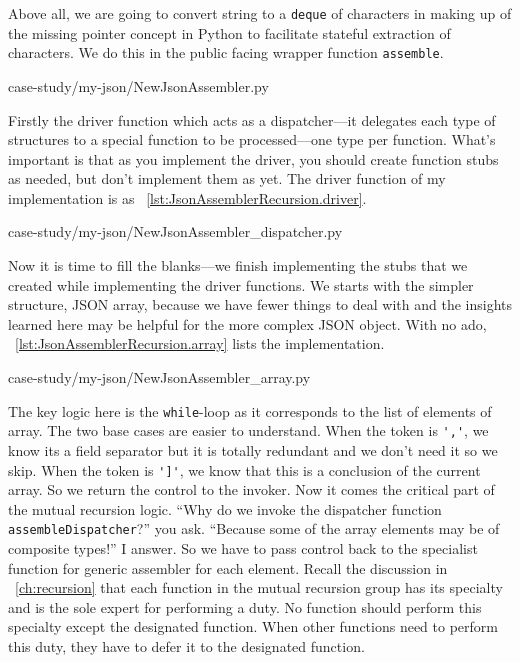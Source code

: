 \documentclass[oneside,11pt]{book}
\theoremstyle{definition}
\theoremstyle{remark}
\newcommand{\code}[1]{\mbox{\lstinline{#1}}}
\newcommand{\python}{Python }
\begin{document}
Above all, we are going to convert string to a \code{deque} of characters in making up of the
missing pointer concept in \python to facilitate stateful extraction of characters.
We do this in the public facing wrapper function \code{assemble}.
\begin{table}[H]

{case-study/my-json/NewJsonAssembler.py}
\end{table}

Firstly the driver function which acts as a dispatcher---it delegates each type
of structures to a special function to be processed---one type per function.
What's important is that as you implement the driver, you should create function stubs as
needed, but don't implement them as yet.
The driver function of my implementation is as ~\autoref{lst:JsonAssemblerRecursion.driver}.

\begin{table}[H]

{case-study/my-json/NewJsonAssembler_dispatcher.py}
\end{table}

Now it is time to fill the blanks---we finish implementing the stubs that we created
while implementing the driver functions.
We starts with the simpler structure, JSON array, because we have fewer things to deal with and the
insights learned here may be helpful for the more complex JSON object.
With no ado, ~\autoref{lst:JsonAssemblerRecursion.array} lists the implementation.

\begin{table}[H]

{case-study/my-json/NewJsonAssembler_array.py}
\end{table}

The key logic here is the \code{while}-loop as it corresponds to the list of elements of array.
The two base cases are easier to understand.
When the token is \code{','}, we know its a field separator but it is totally redundant and we
don't need it so we skip.
When the token is \code{']'}, we know that this is a conclusion of the current array.
So we return the control to the invoker.
Now it comes the critical part of the mutual recursion logic.
``Why do we invoke the dispatcher function \code{assembleDispatcher}?'' you ask.
``Because some of the array elements may be of composite types!'' I answer.
So we have to pass control back to the specialist function for generic assembler for each element.
Recall the discussion in ~\autoref{ch:recursion} that each function in the mutual recursion group
has its specialty and is the sole expert for performing a duty.
No function should perform this specialty except the designated function.
When other functions need to perform this duty, they have to defer it to the designated function.
\end{document}

